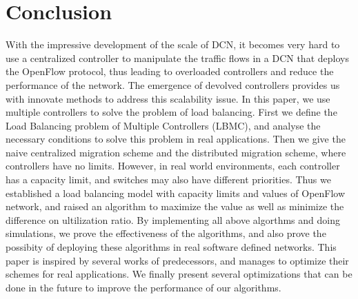 
\chapter{Conclusion}
\label{chap:conclusion}

With the impressive development of the scale of DCN, it becomes very hard to use a centralized controller to manipulate the traffic flows in a DCN that deploys the OpenFlow protocol, thus leading to overloaded controllers and reduce the performance of the network. The emergence of devolved controllers provides us with innovate methods to address this scalability issue. In this paper, we use multiple controllers to solve the problem of load balancing. First we define the Load Balancing problem of Multiple Controllers (LBMC), and analyse the necessary conditions to solve this problem in real applications. Then we give the naive centralized migration scheme and the distributed migration scheme, where controllers have no limits. However, in real world environments, each controller has a capacity limit, and switches may also have different priorities. Thus we established a load balancing model with capacity limits and values of OpenFlow network, and raised an algorithm to maximize the value as well as minimize the difference on ultilization ratio. By implementing all above algorthms and doing simulations, we prove the effectiveness of the algorithms, and also prove the possibity of deploying these algorithms in real software defined networks. This paper is inspired by several works of predecessors, and manages to optimize their schemes for real applications. We finally present several optimizations that can be done in the future to improve the performance of our algorithms. 
